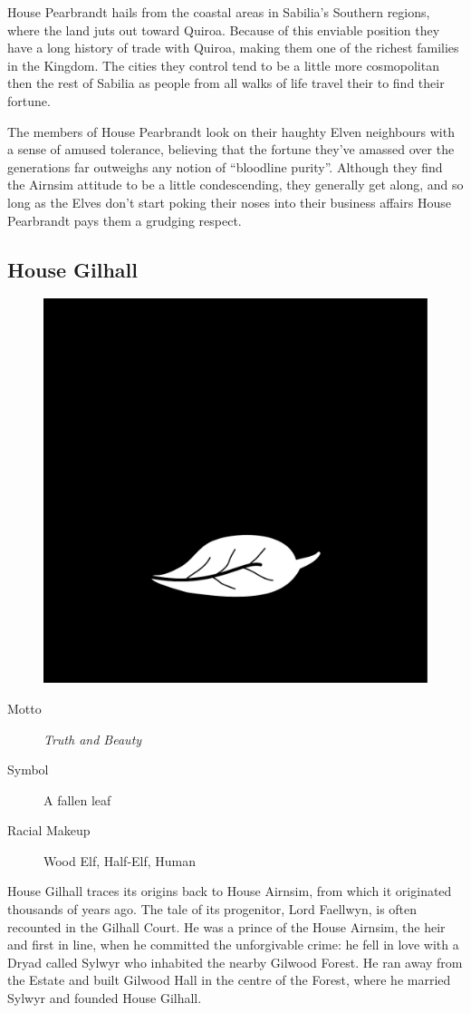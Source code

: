 \documentclass[10pt,twoside,openright,a4paper,twocolumn]{book}
\begin{document}
\noindent
House Pearbrandt hails from the coastal areas in Sabilia's Southern regions,
where the land juts out toward Quiroa.  Because of this enviable position they
have a long history of trade with Quiroa, making them one of the richest
families in the Kingdom.  The cities they control tend to be a little more
cosmopolitan then the rest of Sabilia as people from all walks of life travel
their to find their fortune.

The members of House Pearbrandt look on their haughty Elven neighbours with a
sense of amused tolerance, believing that the fortune they've amassed over the
generations far outweighs any notion of ``bloodline purity''.  Although they
find the Airnsim attitude to be a little condescending, they generally get
along, and so long as the Elves don't start poking their noses into their
business affairs House Pearbrandt pays them a grudging respect.

\subsection*{House Gilhall}

\begin{figure}
  \includegraphics[width=0.48\columnwidth]{images/HouseGilhall}
\end{figure}

\begin{description}
\item[Motto] \textit{Truth and Beauty}

\item[Symbol] A fallen leaf

\item[Racial Makeup] Wood Elf, Half-Elf, Human
\end{description}

\noindent
House Gilhall traces its origins back to House Airnsim, from which it
originated thousands of years ago.  The tale of its progenitor, Lord Faellwyn,
is often recounted in the Gilhall Court.  He was a prince of the House Airnsim,
the heir and first in line, when he committed the unforgivable crime: he fell
in love with a Dryad called Sylwyr who inhabited the nearby Gilwood Forest.  He
ran away from the Estate and built Gilwood Hall in the centre of the Forest,
where he married Sylwyr and founded House Gilhall.
\end{document}

